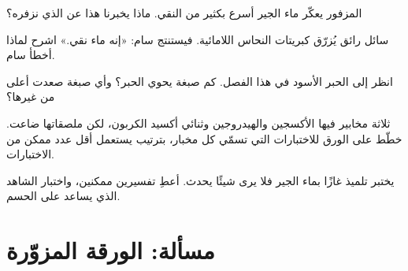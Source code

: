 \begin{exercise}[$\star\star$]\label{exo:g7:identifying-substances:8}
 المزفور يعكّر ماء الجير أسرع بكثير من  النقي. ماذا يخبرنا
هذا عن  الذي نزفره؟
\end{exercise}

\begin{exercise}[$\star\star$]\label{exo:g7:identifying-substances:9}
سائل رائق يُزرّق كبريتات النحاس اللامائية. فيستنتج سام: «إنه ماء
نقي.» اشرح لماذا أخطأ سام.
\end{exercise}

\begin{exercise}[$\star\star$]\label{exo:g7:identifying-substances:10}
انظر إلى  الحبر الأسود في هذا الفصل. كم صبغة يحوي الحبر؟
وأي صبغة صعدت أعلى من غيرها؟
\end{exercise}

\begin{exercise}[$\star\star\star$]\label{exo:g7:identifying-substances:11}
ثلاثة مخابير فيها الأكسجين والهيدروجين وثنائي أكسيد الكربون، لكن ملصقاتها
ضاعت. خطّط على الورق للاختبارات التي تسمّي كل مخبار، بترتيب يستعمل أقل
عدد ممكن من الاختبارات.
\end{exercise}

\begin{exercise}[$\star\star\star$]\label{exo:g7:identifying-substances:12}
يختبر تلميذ غازًا بماء الجير فلا يرى شيئًا يحدث. أعطِ تفسيرين ممكنين،
واختبار الشاهد الذي يساعد على الحسم.
\end{exercise}

\section{مسألة: الورقة المزوّرة}

